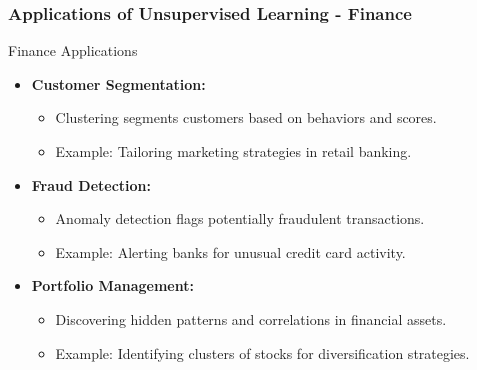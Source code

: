\documentclass[aspectratio=169]{beamer}
\begin{document}
\begin{frame}[fragile]
    \frametitle{Applications of Unsupervised Learning - Finance}
    \begin{block}{Finance Applications}
        \begin{itemize}
            \item \textbf{Customer Segmentation:}
                \begin{itemize}
                    \item Clustering segments customers based on behaviors and scores.
                    \item Example: Tailoring marketing strategies in retail banking.
                \end{itemize}
            \item \textbf{Fraud Detection:}
                \begin{itemize}
                    \item Anomaly detection flags potentially fraudulent transactions.
                    \item Example: Alerting banks for unusual credit card activity.
                \end{itemize}
            \item \textbf{Portfolio Management:}
                \begin{itemize}
                    \item Discovering hidden patterns and correlations in financial assets.
                    \item Example: Identifying clusters of stocks for diversification strategies.
                \end{itemize}
        \end{itemize}
    \end{block}
\end{frame}
\end{document}
